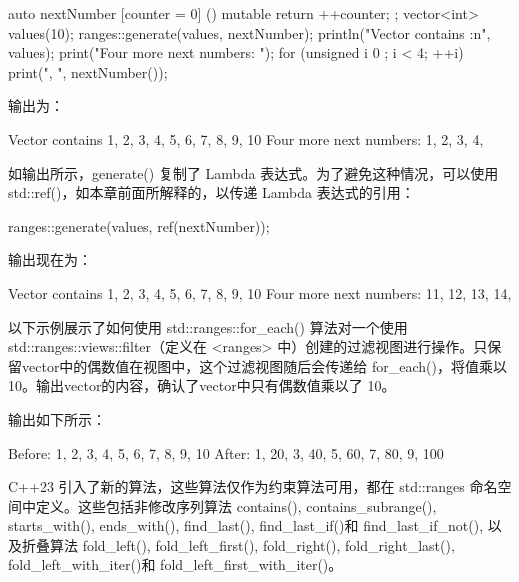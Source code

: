 \begin{cpp}
auto nextNumber { [counter = 0] () mutable { return ++counter; } };
vector<int> values(10);
ranges::generate(values, nextNumber);
println("Vector contains {:n}", values);
print("Four more next numbers: ");
for (unsigned i { 0 }; i < 4; ++i) { print("{}, ", nextNumber()); }
\end{cpp}

输出为：

\begin{shell}
Vector contains 1, 2, 3, 4, 5, 6, 7, 8, 9, 10
Four more next numbers: 1, 2, 3, 4,
\end{shell}

如输出所示，generate() 复制了 Lambda 表达式。为了避免这种情况，可以使用 std::ref()，如本章前面所解释的，以传递 Lambda 表达式的引用：

\begin{cpp}
ranges::generate(values, ref(nextNumber));
\end{cpp}

输出现在为：

\begin{shell}
Vector contains 1, 2, 3, 4, 5, 6, 7, 8, 9, 10
Four more next numbers: 11, 12, 13, 14,
\end{shell}


以下示例展示了如何使用 std::ranges::for\_each() 算法对一个使用 std::ranges::views::filter（定义在 <ranges> 中）创建的过滤视图进行操作。只保留vector中的偶数值在视图中，这个过滤视图随后会传递给 for\_each()，将值乘以 10。输出vector的内容，确认了vector中只有偶数值乘以了 10。


输出如下所示：

\begin{shell}
Before: 1, 2, 3, 4, 5, 6, 7, 8, 9, 10
After: 1, 20, 3, 40, 5, 60, 7, 80, 9, 100
\end{shell}



C++23 引入了新的算法，这些算法仅作为约束算法可用，都在 std::ranges 命名空间中定义。这些包括非修改序列算法 contains(), contains\_subrange(), starts\_with(), ends\_with(), find\_last(), find\_last\_if()和 find\_last\_if\_not(), 以及折叠算法 fold\_left(), fold\_left\_first(), fold\_right(), fold\_right\_last(), fold\_left\_with\_iter()和 fold\_left\_first\_with\_iter()。

